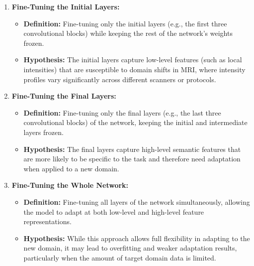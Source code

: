 \begin{enumerate}
	
	\item \textbf{Fine-Tuning the Initial Layers:}
	\begin{itemize}
		\item \textbf{Definition:} Fine-tuning only the initial layers (e.g., the first three convolutional blocks) while keeping the rest of the network's weights frozen.
		\item \textbf{Hypothesis:} The initial layers capture low-level features (such as local intensities) that are susceptible to domain shifts in MRI, where intensity profiles vary significantly across different scanners or protocols.
	\end{itemize}
	
	\item \textbf{Fine-Tuning the Final Layers:}
	\begin{itemize}
		\item \textbf{Definition:} Fine-tuning only the final layers (e.g., the last three convolutional blocks) of the network, keeping the initial and intermediate layers frozen.
		\item \textbf{Hypothesis:} The final layers capture high-level semantic features that are more likely to be specific to the task and therefore need adaptation when applied to a new domain.
	\end{itemize}
	
	\item \textbf{Fine-Tuning the Whole Network:}
	\begin{itemize}
		\item \textbf{Definition:} Fine-tuning all layers of the network simultaneously, allowing the model to adapt at both low-level and high-level feature representations.
		\item \textbf{Hypothesis:} While this approach allows full flexibility in adapting to the new domain, it may lead to overfitting and weaker adaptation results, particularly when the amount of target domain data is limited.
	\end{itemize}
	
\end{enumerate}

